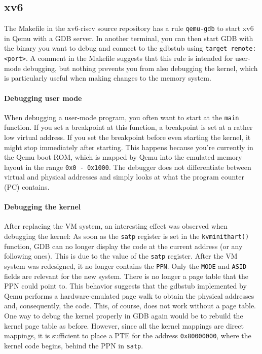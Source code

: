 \subsection{xv6}
The Makefile in the xv6-riscv source repository has a rule \texttt{qemu-gdb} to start xv6 in Qemu with a GDB server. In another terminal, you can then start GDB with the binary you want to debug and connect to the gdbstub using \texttt{target remote:<port>}. A comment in the Makefile suggests that this rule is intended for user-mode debugging, but nothing prevents you from also debugging the kernel, which is particularly useful when making changes to the memory system.

\paragraph{Debugging user mode} When debugging a user-mode program, you often want to start at the \texttt{main} function. If you set a breakpoint at this function, a breakpoint is set at a rather low virtual address. If you set the breakpoint before even starting the kernel, it might stop immediately after starting. This happens because you're currently in the Qemu boot ROM, which is mapped by Qemu into the emulated memory layout in the range \texttt{0x0 - 0x1000}. The debugger does not differentiate between virtual and physical addresses and simply looks at what the program counter (PC) contains. 

\paragraph{Debugging the kernel} After replacing the VM system, an interesting effect was observed when debugging the kernel: As soon as the \texttt{satp} register is set in the \texttt{kvminithart()} function, GDB can no longer display the code at the current address (or any following ones). This is due to the value of the \texttt{satp} register. After the VM system was redesigned, it no longer contains the \texttt{PPN}. Only the \texttt{MODE} and \texttt{ASID} fields are relevant for the new system. There is no longer a page table that the PPN could point to. This behavior suggests that the gdbstub implemented by Qemu performs a hardware-emulated page walk to obtain the physical addresses and, consequently, the code. This, of course, does not work without a page table. One way to debug the kernel properly in GDB again would be to rebuild the kernel page table as before. However, since all the kernel mappings are direct mappings, it is sufficient to place a PTE for the address \texttt{0x80000000}, where the kernel code begins, behind the PPN in \texttt{satp}.

